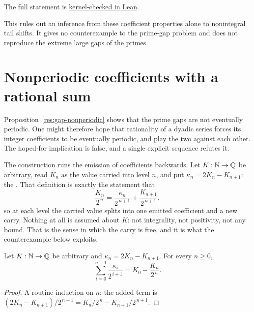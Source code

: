 \documentclass[11pt]{article}
\begin{document}
The full statement is \href{https://github.com/wcook04/plectis-erdos/blob/d4fed71423840f70f10edf27b9ad27c22fc4f49a/ErdosProblems/Erdos251/AllResidueLogarithmicR9.lean#L503}{kernel-checked in Lean}.


This rules out an inference from these coefficient properties alone to
nonintegral tail shifts.  It gives no counterexample to the prime-gap problem
and does not reproduce the extreme large gaps of the primes.

\section{Nonperiodic coefficients with a rational sum}\label{sec:carry}

Proposition~\ref{res:gap-nonperiodic} shows that the prime gaps are not
eventually periodic.  One might therefore hope that rationality of a dyadic
series forces its integer coefficients to be eventually periodic, and play the
two against each other.  The hoped-for implication is false, and a single
explicit sequence refutes it.

The construction runs the emission of coefficients backwards.  Let
$K:\mathbb{N}\to\mathbb{Q}$ be arbitrary, read $K_n$ as the value carried into level $n$, and
put $\kappa_n=2K_n-K_{n+1}$: the
.
That definition is exactly the statement that
\[
 \frac{K_n}{2^{\,n}}
 =\frac{\kappa_n}{2^{\,n+1}}+\frac{K_{n+1}}{2^{\,n+1}} ,
\]
so at each level the carried value splits into one emitted coefficient and a
new carry.  Nothing at all is assumed about $K$: not integrality, not
positivity, not any bound.  That is the sense in which the carry is free, and
it is what the counterexample below exploits.

\begin{proposition}\label{res:telescope}
Let $K:\mathbb{N}\to\mathbb{Q}$ be arbitrary and $\kappa_n=2K_n-K_{n+1}$.  For every $n\ge0$,
\[
 \sum_{i=0}^{n-1}\frac{\kappa_i}{2^{\,i+1}}=K_0-\frac{K_n}{2^{\,n}} .
\]
\end{proposition}

\begin{proof}
A routine induction on $n$; the added term is
$(2K_n-K_{n+1})/2^{\,n+1}=K_n/2^{\,n}-K_{n+1}/2^{\,n+1}$.
\end{proof}
\end{document}
